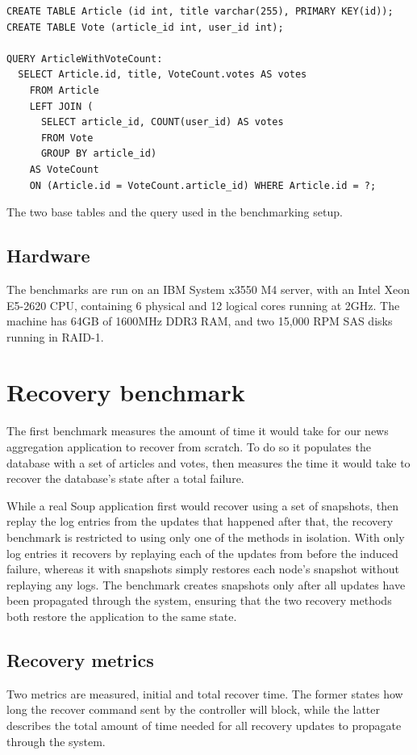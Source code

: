 \documentclass[b5paper]{report}
\begin{document}
\begin{listing}[H]
  \begin{verbatim}
CREATE TABLE Article (id int, title varchar(255), PRIMARY KEY(id));
CREATE TABLE Vote (article_id int, user_id int);

QUERY ArticleWithVoteCount:
  SELECT Article.id, title, VoteCount.votes AS votes
    FROM Article
    LEFT JOIN (
      SELECT article_id, COUNT(user_id) AS votes
      FROM Vote
      GROUP BY article_id)
    AS VoteCount
    ON (Article.id = VoteCount.article_id) WHERE Article.id = ?;
\end{verbatim}
  \caption{
    The two base tables and the query used in the benchmarking setup.
    \label{lst:benchmark-schema}
  }
\end{listing}

\subsection{Hardware}
The benchmarks are run on an IBM System x3550 M4 server, with an Intel Xeon
E5-2620 CPU, containing 6 physical and 12 logical cores running at 2GHz. The machine
has 64GB of 1600MHz DDR3 RAM, and two 15,000 RPM SAS disks running in RAID-1.

\section{Recovery benchmark}
The first benchmark measures the amount of time it would take for our news
aggregation application to recover from scratch. To do so it populates the
database with a set of articles and votes, then measures the time it
would take to recover the database's state after a total failure.

While a real Soup application first would recover using a set of snapshots, then
replay the log entries from the updates that happened after that, the recovery
benchmark is restricted to using only one of the methods in isolation. With
only log entries it recovers by replaying each of the updates from before the
induced failure, whereas it with snapshots simply restores each node's snapshot
without replaying any logs. The benchmark creates snapshots only after all
updates have been propagated through the system, ensuring that the two recovery
methods both restore the application to the same state.

\subsection{Recovery metrics}
Two metrics are measured, initial and total recover time. The former states how
long the recover command sent by the controller will block, while the latter
describes the total amount of time needed for all recovery updates to propagate
through the system.
\end{document}
